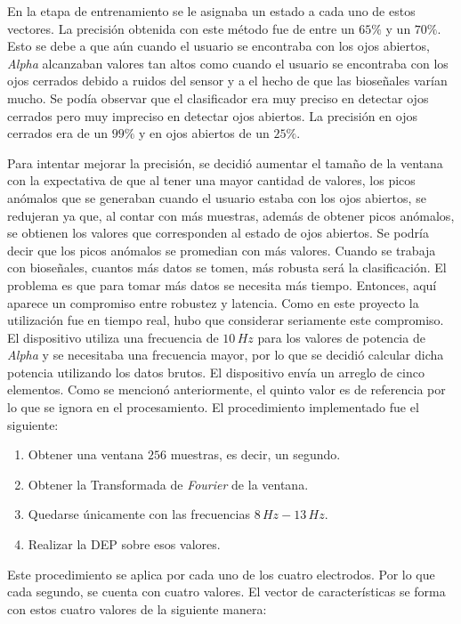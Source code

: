 En la etapa de entrenamiento se le asignaba un estado a cada uno de estos vectores. La precisión obtenida con este método fue de entre un $65\%$ y un $70\%$. Esto se debe a que aún cuando el usuario se encontraba con los ojos abiertos, \emph{Alpha} alcanzaban valores tan altos como cuando el usuario se encontraba con los ojos cerrados debido a ruidos del sensor y a el hecho de que las bioseñales varían mucho. Se podía observar que el clasificador era muy preciso en detectar ojos cerrados pero muy impreciso en detectar ojos abiertos. La precisión en ojos cerrados era de un $99\%$ y en ojos abiertos de un $25\%$.

Para intentar mejorar la precisión, se decidió aumentar el tamaño de la ventana con la expectativa de que al tener una mayor cantidad de valores, los picos anómalos que se generaban cuando el usuario estaba con los ojos abiertos, se redujeran ya que, al contar con más muestras, además de obtener picos anómalos, se obtienen los valores que corresponden al estado de ojos abiertos. Se podría decir que los picos anómalos se promedian con más valores. Cuando se trabaja con bioseñales, cuantos más datos se tomen, más robusta será la clasificación. El problema es que para tomar más datos se necesita más tiempo. Entonces, aquí aparece un compromiso entre robustez y latencia. Como en este proyecto la utilización fue en tiempo real, hubo que considerar seriamente este compromiso. El dispositivo utiliza una frecuencia de $10 \, Hz$ para los valores de potencia de \emph{Alpha} y se necesitaba una frecuencia mayor, por lo que se decidió calcular dicha potencia utilizando los datos brutos. El dispositivo envía un arreglo de cinco elementos. Como se mencionó anteriormente, el quinto valor es de referencia por lo que se ignora en el procesamiento. El procedimiento implementado fue el siguiente:

 \begin{enumerate}
 \item Obtener una ventana $256$ muestras, es decir, un segundo.
 \item Obtener la Transformada de \emph{Fourier} de la ventana.
 \item Quedarse únicamente con las frecuencias $8 \, Hz-13 \, Hz$.
 \item Realizar la DEP sobre esos valores.
 \end{enumerate}
 
Este procedimiento se aplica por cada uno de los cuatro electrodos. Por lo que cada segundo, se cuenta con cuatro valores. El vector de características se forma con estos cuatro valores de la siguiente manera:
 
